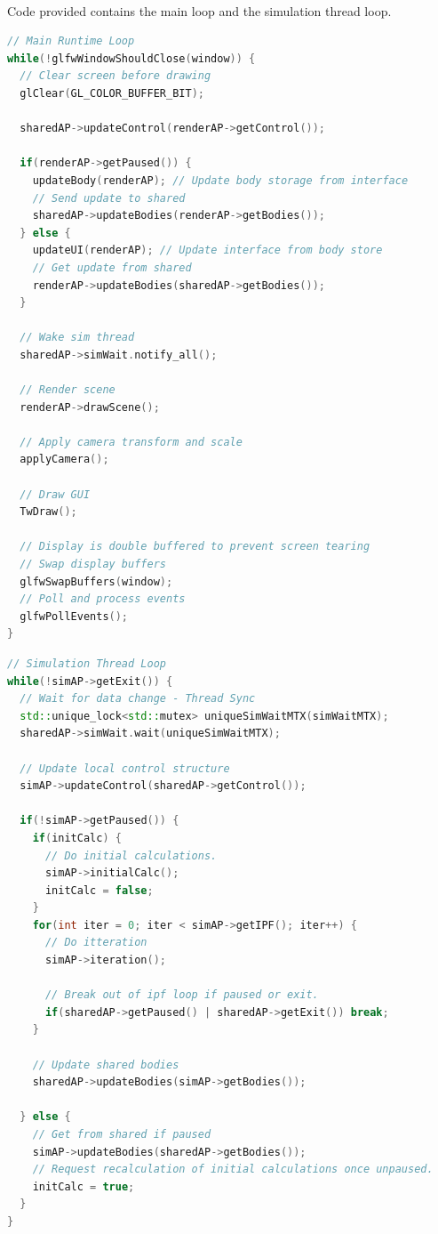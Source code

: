 \paragraph{}
Code provided contains the main loop and the simulation thread loop.
\begin{lstlisting}[language=c++]
// Main Runtime Loop
while(!glfwWindowShouldClose(window)) {
  // Clear screen before drawing
  glClear(GL_COLOR_BUFFER_BIT);

  sharedAP->updateControl(renderAP->getControl());

  if(renderAP->getPaused()) {
    updateBody(renderAP); // Update body storage from interface
    // Send update to shared
    sharedAP->updateBodies(renderAP->getBodies());
  } else {
    updateUI(renderAP); // Update interface from body store
    // Get update from shared
    renderAP->updateBodies(sharedAP->getBodies());
  }

  // Wake sim thread
  sharedAP->simWait.notify_all();

  // Render scene
  renderAP->drawScene();

  // Apply camera transform and scale
  applyCamera();

  // Draw GUI
  TwDraw();

  // Display is double buffered to prevent screen tearing
  // Swap display buffers
  glfwSwapBuffers(window);
  // Poll and process events
  glfwPollEvents();
}
\end{lstlisting}

\begin{lstlisting}[language=c++]
// Simulation Thread Loop
while(!simAP->getExit()) {
  // Wait for data change - Thread Sync
  std::unique_lock<std::mutex> uniqueSimWaitMTX(simWaitMTX);
  sharedAP->simWait.wait(uniqueSimWaitMTX);

  // Update local control structure
  simAP->updateControl(sharedAP->getControl());

  if(!simAP->getPaused()) {
    if(initCalc) {
      // Do initial calculations.
      simAP->initialCalc();
      initCalc = false;
    }
    for(int iter = 0; iter < simAP->getIPF(); iter++) {
      // Do itteration
      simAP->iteration();

      // Break out of ipf loop if paused or exit.
      if(sharedAP->getPaused() | sharedAP->getExit()) break;
    }

    // Update shared bodies
    sharedAP->updateBodies(simAP->getBodies());
    
  } else {
    // Get from shared if paused
    simAP->updateBodies(sharedAP->getBodies());
    // Request recalculation of initial calculations once unpaused.
    initCalc = true;
  }
}
\end{lstlisting}


